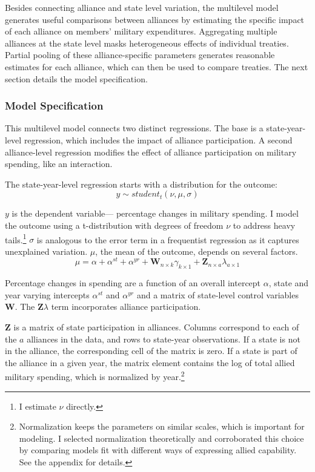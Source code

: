 \documentclass[12pt]{article}
\begin{document}
Besides connecting alliance and state level variation, the multilevel model generates useful comparisons between alliances by estimating the specific impact of each alliance on members' military expenditures. 
Aggregating multiple alliances at the state level masks heterogeneous effects of individual treaties. 
Partial pooling of these alliance-specific parameters generates reasonable estimates for each alliance, which can then be used to compare treaties. 
The next section details the model specification. 
 


\subsubsection*{Model Specification} 

This multilevel model connects two distinct regressions. 
The base is a state-year-level regression, which includes the impact of alliance participation.
A second alliance-level regression modifies the effect of alliance participation on military spending, like an interaction. 


The state-year-level regression starts with a distribution for the outcome:
\begin{equation}
y \sim student_t(\nu, \mu, \sigma)
\end{equation}
 

$y$ is the dependent variable--- percentage changes in military spending. 
I model the outcome using a t-distribution with degrees of freedom $\nu$ to address heavy tails.\footnote{I estimate $\nu$ directly.}
$\sigma$ is analogous to the error term in a frequentist regression as it captures unexplained variation.  
$\mu$, the mean of the outcome, depends on several factors.
\begin{equation}
\mu = \alpha + \alpha^{st} + \alpha^{yr} +\textbf{W}_{n \times k} \gamma_{k \times 1}  + \textbf{Z}_{n \times a} \lambda_{a \times 1} 
\end{equation}


Percentage changes in spending are a function of an overall intercept $\alpha$, state and year varying intercepts $\alpha^{st}$ and $\alpha^{yr}$ and a matrix of state-level control variables $\textbf{W}$.
The $\textbf{Z} \lambda$ term incorporates alliance participation.


$\textbf{Z}$ is a matrix of state participation in alliances. 
Columns correspond to each of the $a$ alliances in the data, and rows to state-year observations. 
If a state is not in the alliance, the corresponding cell of the matrix is zero.
If a state is part of the alliance in a given year, the matrix element contains the log of total allied military spending, which is normalized by year.\footnote{Normalization keeps the parameters on similar scales, which is important for modeling. I selected normalization theoretically and corroborated this choice by comparing models fit with different ways of expressing allied capability. See the appendix for details.} 
\end{document}
